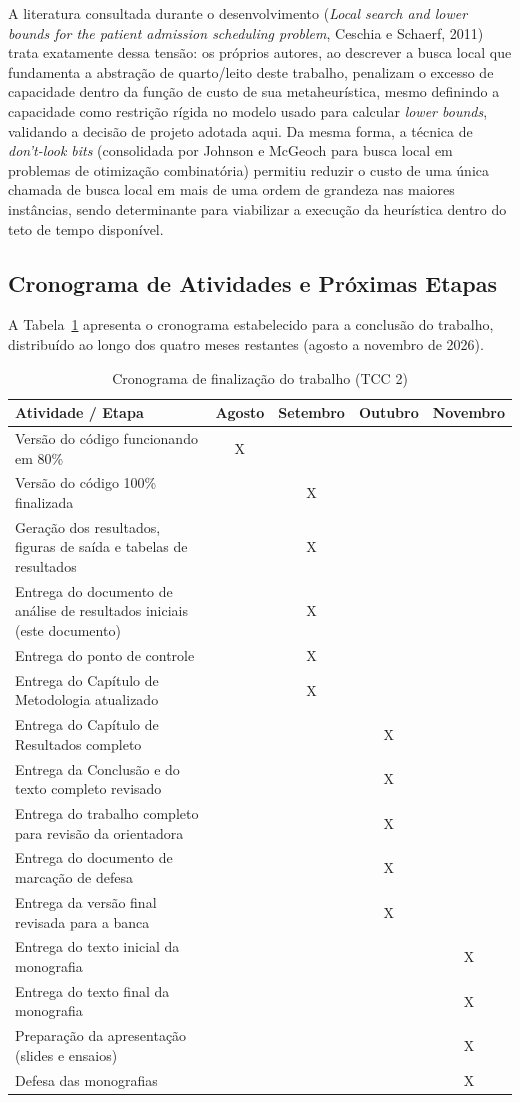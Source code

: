 \documentclass[12pt,a4paper]{article}
\begin{document}
A literatura consultada durante o desenvolvimento (\textit{Local search and lower
bounds for the patient admission scheduling problem}, Ceschia e Schaerf, 2011) trata
exatamente dessa tensão: os próprios autores, ao descrever a busca local que
fundamenta a abstração de quarto/leito deste trabalho, penalizam o excesso de
capacidade dentro da função de custo de sua metaheurística, mesmo definindo a
capacidade como restrição rígida no modelo usado para calcular \textit{lower
bounds}, validando a decisão de projeto adotada aqui. Da mesma forma, a técnica de
\textit{don't-look bits} (consolidada por Johnson e McGeoch para busca local em
problemas de otimização combinatória) permitiu reduzir o custo de uma única chamada
de busca local em mais de uma ordem de grandeza nas maiores instâncias, sendo
determinante para viabilizar a execução da heurística dentro do teto de tempo
disponível.


\subsection{Cronograma de Atividades e Próximas Etapas}

A Tabela~\ref{tab:cronograma} apresenta o cronograma estabelecido para a conclusão
do trabalho, distribuído ao longo dos quatro meses restantes (agosto a novembro de
2026).

\begin{table}[h]
\centering
\caption{Cronograma de finalização do trabalho (TCC 2)}
\label{tab:cronograma}
\footnotesize
\begin{tabular}{p{8cm}cccc}
\toprule
Atividade / Etapa & Agosto & Setembro & Outubro & Novembro \\
\midrule
Versão do código funcionando em 80\% & X & & & \\
Versão do código 100\% finalizada & & X & & \\
Geração dos resultados, figuras de saída e tabelas de resultados & & X & & \\
Entrega do documento de análise de resultados iniciais (este documento) & & X & & \\
Entrega do ponto de controle & & X & & \\
Entrega do Capítulo de Metodologia atualizado & & X & & \\
Entrega do Capítulo de Resultados completo & & & X & \\
Entrega da Conclusão e do texto completo revisado & & & X & \\
Entrega do trabalho completo para revisão da orientadora & & & X & \\
Entrega do documento de marcação de defesa & & & X & \\
Entrega da versão final revisada para a banca & & & X & \\
Entrega do texto inicial da monografia & & & & X \\
Entrega do texto final da monografia & & & & X \\
Preparação da apresentação (slides e ensaios) & & & & X \\
Defesa das monografias & & & & X \\
\bottomrule
\end{tabular}
\end{table}
\end{document}
